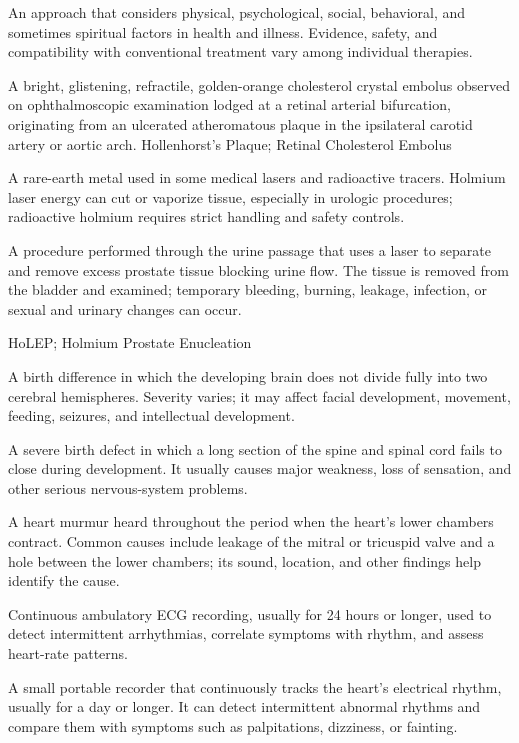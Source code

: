  An approach that considers physical, psychological, social, behavioral, and sometimes spiritual factors in health and illness. Evidence, safety, and compatibility with conventional treatment vary among individual therapies.

 A bright, glistening, refractile, golden-orange cholesterol crystal embolus observed on ophthalmoscopic examination lodged at a retinal arterial bifurcation, originating from an ulcerated atheromatous plaque in the ipsilateral carotid artery or aortic arch.
\synonyms
Hollenhorst's Plaque; Retinal Cholesterol Embolus

 A rare-earth metal used in some medical lasers and radioactive tracers. Holmium laser energy can cut or vaporize tissue, especially in urologic procedures; radioactive holmium requires strict handling and safety controls.

 A procedure performed through the urine passage that uses a laser to separate and remove excess prostate tissue blocking urine flow. The tissue is removed from the bladder and examined; temporary bleeding, burning, leakage, infection, or sexual and urinary changes can occur.

\synonyms
HoLEP; Holmium Prostate Enucleation

 A birth difference in which the developing brain does not divide fully into two cerebral hemispheres. Severity varies; it may affect facial development, movement, feeding, seizures, and intellectual development.

 A severe birth defect in which a long section of the spine and spinal cord fails to close during development. It usually causes major weakness, loss of sensation, and other serious nervous-system problems.

 A heart murmur heard throughout the period when the heart's lower chambers contract. Common causes include leakage of the mitral or tricuspid valve and a hole between the lower chambers; its sound, location, and other findings help identify the cause.

 Continuous ambulatory ECG recording, usually for 24 hours or longer, used to detect intermittent arrhythmias, correlate symptoms with rhythm, and assess heart-rate patterns.

 A small portable recorder that continuously tracks the heart’s electrical rhythm, usually for a day or longer. It can detect intermittent abnormal rhythms and compare them with symptoms such as palpitations, dizziness, or fainting.

